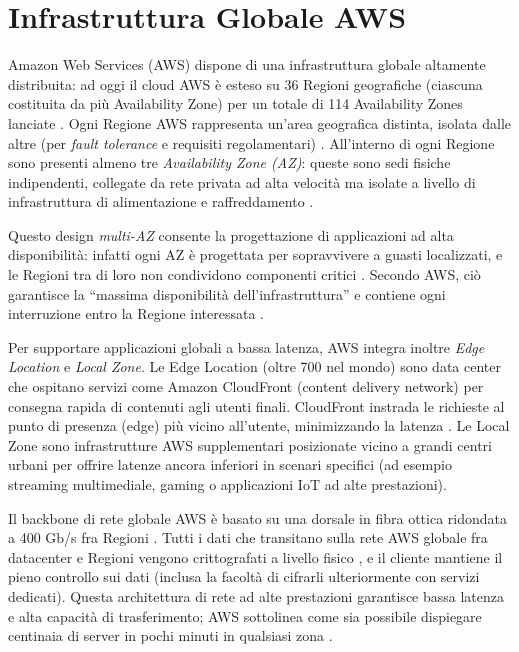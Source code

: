 \section{Infrastruttura Globale AWS}
Amazon Web Services (AWS) dispone di una infrastruttura globale altamente distribuita: ad oggi il cloud AWS è esteso su 36 Regioni geografiche (ciascuna costituita da più Availability Zone) per un totale di 114 Availability Zones lanciate \cite{aws-global-infra}. Ogni Regione AWS rappresenta un’area geografica distinta, isolata dalle altre (per \textit{fault tolerance} e requisiti regolamentari) \cite{aws-global-infra}. All’interno di ogni Regione sono presenti almeno tre \textit{Availability Zone (AZ)}: queste sono sedi fisiche indipendenti, collegate da rete privata ad alta velocità ma isolate a livello di infrastruttura di alimentazione e raffreddamento \cite{aws-global-infra}.

Questo design \textit{multi-AZ} consente la progettazione di applicazioni ad alta disponibilità: infatti ogni AZ è progettata per sopravvivere a guasti localizzati, e le Regioni tra di loro non condividono componenti critici \cite{aws-global-infra}. Secondo AWS, ciò garantisce la “massima disponibilità dell’infrastruttura” e contiene ogni interruzione entro la Regione interessata \cite{aws-global-infra}.

Per supportare applicazioni globali a bassa latenza, AWS integra inoltre \textit{Edge Location} e \textit{Local Zone}. Le Edge Location (oltre 700 nel mondo) sono data center che ospitano servizi come Amazon CloudFront (content delivery network) per consegna rapida di contenuti agli utenti finali. CloudFront instrada le richieste al punto di presenza (edge) più vicino all’utente, minimizzando la latenza \cite{aws-cloudfront}. Le Local Zone sono infrastrutture AWS supplementari posizionate vicino a grandi centri urbani per offrire latenze ancora inferiori in scenari specifici (ad esempio streaming multimediale, gaming o applicazioni IoT ad alte prestazioni).

Il backbone di rete globale AWS è basato su una dorsale in fibra ottica ridondata a 400 Gb/s fra Regioni \cite{aws-network}. Tutti i dati che transitano sulla rete AWS globale fra datacenter e Regioni vengono crittografati a livello fisico \cite{aws-network}, e il cliente mantiene il pieno controllo sui dati (inclusa la facoltà di cifrarli ulteriormente con servizi dedicati). Questa architettura di rete ad alte prestazioni garantisce bassa latenza e alta capacità di trasferimento; AWS sottolinea come sia possibile dispiegare centinaia di server in pochi minuti in qualsiasi zona \cite{aws-network}.

